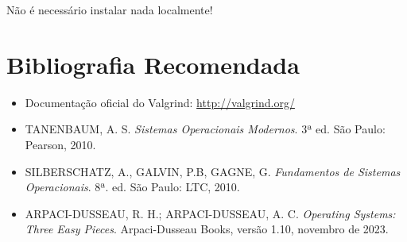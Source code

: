 \documentclass[11pt,a4paper]{article}
\begin{document}
Não é necessário instalar nada localmente!

\section{Bibliografia Recomendada}

\begin{itemize}
    \item Documentação oficial do Valgrind: \url{http://valgrind.org/}
    \item TANENBAUM, A. S. \textit{Sistemas Operacionais Modernos}. 3ª ed. São Paulo: Pearson, 2010.
    \item SILBERSCHATZ, A., GALVIN, P.B, GAGNE, G. \textit{Fundamentos de Sistemas Operacionais}. 8ª. ed. São Paulo: LTC, 2010.
    \item ARPACI-DUSSEAU, R. H.; ARPACI-DUSSEAU, A. C. \textit{Operating Systems: Three Easy Pieces}. Arpaci-Dusseau Books, versão 1.10, novembro de 2023.
\end{itemize}
\end{document}
